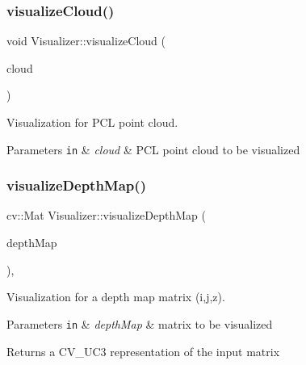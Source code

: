 \subsubsection{\texorpdfstring{visualize\+Cloud()}{visualizeCloud()}}
{\footnotesize\ttfamily void Visualizer\+::visualize\+Cloud (\begin{DoxyParamCaption}\item[{pcl\+::\+Point\+Cloud$<$ pcl\+::\+Point\+X\+YZ $>$\+::Ptr}]{cloud }\end{DoxyParamCaption})\hspace{0.3cm}{\ttfamily [static]}}



Visualization for P\+CL point cloud. 


\begin{DoxyParams}[1]{Parameters}
\mbox{\tt in}  & {\em cloud} & P\+CL point cloud to be visualized \\
\hline
\end{DoxyParams}
\hypertarget{class_visualizer_a5af40bebe3119c1d605351f42d2d8b95}{}\label{class_visualizer_a5af40bebe3119c1d605351f42d2d8b95} 
\subsubsection{\texorpdfstring{visualize\+Depth\+Map()}{visualizeDepthMap()}}
{\footnotesize\ttfamily cv\+::\+Mat Visualizer\+::visualize\+Depth\+Map (\begin{DoxyParamCaption}\item[{cv\+::\+Mat \&}]{depth\+Map }\end{DoxyParamCaption})\hspace{0.3cm}{\ttfamily [static]}, {\ttfamily [private]}}



Visualization for a depth map matrix (i,j,z). 


\begin{DoxyParams}[1]{Parameters}
\mbox{\tt in}  & {\em depth\+Map} & matrix to be visualized \\
\hline
\end{DoxyParams}
\begin{DoxyReturn}{Returns}
a C\+V\+\_\+U\+C3 representation of the input matrix 
\end{DoxyReturn}
\hypertarget{class_visualizer_aa4436945eb7f9220b55d46914e8c5005}{}\label{class_visualizer_aa4436945eb7f9220b55d46914e8c5005} 
